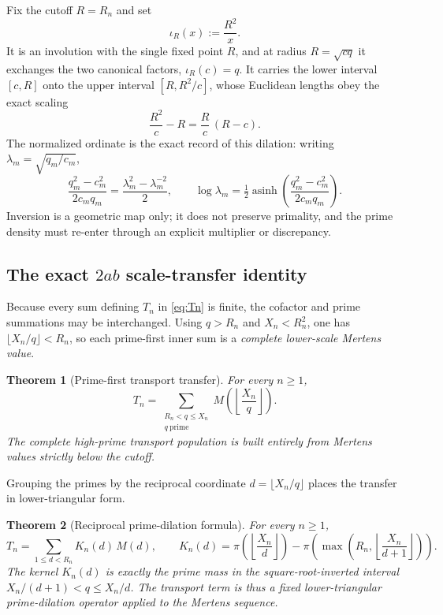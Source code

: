 \documentclass[11pt]{article}
\newtheorem{theorem}{Theorem}[section]
\theoremstyle{definition}
\theoremstyle{remark}
\newcommand{\1}{\mathbf{1}}
\begin{document}
Fix the cutoff $R=R_n$ and set
\begin{equation}
 \iota_R(x):=\frac{R^2}{x}.
 \label{eq:sqrt-inversion}
\end{equation}
It is an involution with the single fixed point $R$, and at radius $R=\sqrt{cq}$ it exchanges the two canonical factors, $\iota_R(c)=q$.  It carries the lower interval $[c,R]$ onto the upper interval $[R,R^2/c]$, whose Euclidean lengths obey the exact scaling
\begin{equation}
 \frac{R^2}{c}-R=\frac Rc\,(R-c).
 \label{eq:inversion-length}
\end{equation}
The normalized ordinate is the exact record of this dilation: writing $\lambda_m=\sqrt{q_m/c_m}$,
\begin{equation}
 \frac{q_m^2-c_m^2}{2c_mq_m}
 =\frac{\lambda_m^2-\lambda_m^{-2}}2,
 \qquad
 \log\lambda_m=\tfrac12\operatorname{asinh}\!\left(\frac{q_m^2-c_m^2}{2c_mq_m}\right).
 \label{eq:twoab-dilation}
\end{equation}
Inversion is a geometric map only; it does not preserve primality, and the prime density must re-enter through an explicit multiplier or discrepancy.

\subsection{The exact $2ab$ scale-transfer identity}

Because every sum defining $T_n$ in \cref{eq:Tn} is finite, the cofactor and prime summations may be interchanged.  Using $q>R_n$ and $X_n<R_n^2$, one has $\lfloor X_n/q\rfloor<R_n$, so each prime-first inner sum is a \emph{complete lower-scale Mertens value}.

\begin{theorem}[Prime-first transport transfer]
\label{thm:transport-primefirst}
For every $n\ge1$,
\begin{equation}
 \boxed{
 T_n
 =\sum_{\substack{R_n<q\le X_n\\ q\ \mathrm{prime}}}
 M\!\left(\left\lfloor\frac{X_n}{q}\right\rfloor\right).
 }
 \label{eq:transport-primefirst}
\end{equation}
The complete high-prime transport population is built entirely from Mertens values strictly below the cutoff.
\end{theorem}

Grouping the primes by the reciprocal coordinate $d=\lfloor X_n/q\rfloor$ places the transfer in lower-triangular form.

\begin{theorem}[Reciprocal prime-dilation formula]
\label{thm:prime-dilation}
For every $n\ge1$,
\begin{equation}
 \boxed{
 T_n=\sum_{1\le d<R_n}K_n(d)\,M(d),
 \qquad
 K_n(d)=\pi\!\left(\left\lfloor\frac{X_n}{d}\right\rfloor\right)
 -\pi\!\left(\max\!\left(R_n,\left\lfloor\frac{X_n}{d+1}\right\rfloor\right)\right).
 }
 \label{eq:prime-dilation}
\end{equation}
The kernel $K_n(d)$ is exactly the prime mass in the square-root-inverted interval $X_n/(d+1)<q\le X_n/d$.  The transport term is thus a fixed lower-triangular prime-dilation operator applied to the Mertens sequence.
\end{theorem}
\end{document}
